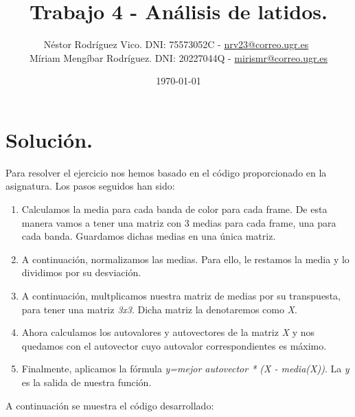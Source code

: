 \documentclass[11pt]{article}
\title{Trabajo 4 - Análisis de latidos.}
\author{Néstor Rodríguez Vico. DNI: 75573052C - \href{mailto:nrv23@correo.ugr.es}{nrv23@correo.ugr.es} \\ Míriam Mengíbar Rodríguez. DNI: 20227044Q - \href{mailto:mirismr@correo.ugr.es}{mirismr@correo.ugr.es}}
\date{\today}
\begin{document}
\maketitle

\setlength{\belowdisplayskip}{5pt} 
\setlength{\belowdisplayshortskip}{5pt}
\setlength{\abovedisplayskip}{5pt} 
\setlength{\abovedisplayshortskip}{5pt}

\section{Solución.}

Para resolver el ejercicio nos hemos basado en el código proporcionado en la asignatura. Los pasos seguidos han sido:

\begin{enumerate}
	\item Calculamos la media para cada banda de color para cada frame. De esta manera vamos a tener una matriz con 3 medias para cada frame, una para cada banda. Guardamos dichas medias en una única matriz.
	\item A continuación, normalizamos las medias. Para ello, le restamos la media y lo dividimos por su desviación.
	\item A continuación, multplicamos nuestra matriz de medias por su transpuesta, para tener una matriz \textit{3x3}. Dicha matriz la denotaremos como \textit{X}.
	\item Ahora calculamos los autovalores y autovectores de la matriz \textit{X} y nos quedamos con el autovector cuyo autovalor correspondientes es máximo.
	\item Finalmente, aplicamos la fórmula \textit{y=mejor autovector * (X - media(X))}. La \textit{y} es la salida de nuestra función.
\end{enumerate}

A continuación se muestra el código desarrollado:
\end{document}
